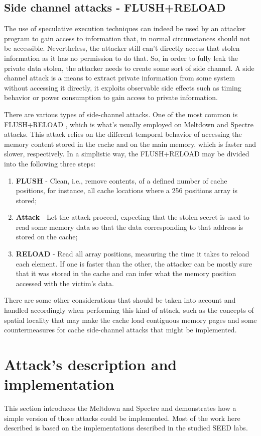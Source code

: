\documentclass[conference]{IEEEtran}
\begin{document}
\subsection{Side channel attacks - FLUSH+RELOAD}
The use of speculative execution techniques can indeed be used by an attacker program to gain access to information that, in normal circumstances should not be accessible. Nevertheless, the attacker still can't directly access that stolen information as it has no permission to do that. So, in order to fully leak the private data stolen, the attacker needs to create some sort of side channel. A side channel attack is a means to extract private information from some system without accessing it directly, it exploits observable side effects such as timing behavior or power consumption to gain access to private information.
\par There are various types of side-channel attacks. One of the most common is FLUSH+RELOAD \cite{flushReload}, which is what's usually employed on Meltdown and Spectre attacks. This attack relies on the different temporal behavior of accessing the memory content stored in the cache and on the main memory, which is faster and slower, respectively. In a simplistic way, the FLUSH+RELOAD may be divided into the following three steps:
\begin{enumerate}
    \item \textbf{FLUSH} - Clean, i.e., remove contents, of a defined number of cache positions, for instance, all cache locations where a 256 positions array is stored;
    \item \textbf{Attack} - Let the attack proceed, expecting that the stolen secret is used to read some memory data so that the data corresponding to that address is stored on the cache;
    \item \textbf{RELOAD} - Read all array positions, measuring the time it takes to reload each element. If one is faster than the other, the attacker can be mostly sure that it was stored in the cache and can infer what the memory position accessed with the victim's data.
\end{enumerate}
There are some other considerations that should be taken into account and handled accordingly when performing this kind of attack, such as the concepts of spatial locality that may make the cache load contiguous memory pages and some countermeasures for cache side-channel attacks that might be implemented.


\section{Attack's description and implementation}
\par This section introduces the Meltdown and Spectre and demonstrates how a simple version of those attacks could be implemented. Most of the work here described is based on the implementations described in the studied SEED labs.
\end{document}
